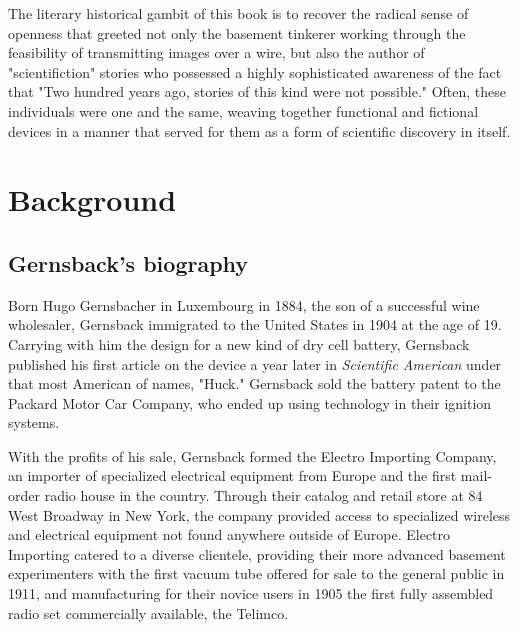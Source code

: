 \documentclass{article}
\begin{document}
The literary historical gambit of this book is to recover the radical sense of openness that greeted not only the basement tinkerer working through the feasibility of transmitting images over a wire, but also the author of "scientifiction" stories who possessed a highly sophisticated awareness of the fact that "Two hundred years ago, stories of this kind were not possible."  Often, these individuals were one and the same, weaving together functional and fictional devices in a manner that served for them as a form of scientific discovery in itself.


\section{Background}

\subsection{Gernsback's biography}

Born Hugo Gernsbacher in Luxembourg in 1884, the son of a successful wine wholesaler, Gernsback immigrated to the United States in 1904 at the age of 19.  Carrying with him the design for a new kind of dry cell battery, Gernsback published his first article on the device a year later in \textit{Scientific American} under that most American of names, "Huck."  Gernsback sold the battery patent to the Packard Motor Car Company, who ended up using technology in their ignition systems.  

With the profits of his sale, Gernsback formed the Electro Importing Company, an importer of specialized electrical equipment from Europe and the first mail-order radio house in the country.  Through their catalog and retail store at 84 West Broadway in New York, the company provided access to specialized wireless and electrical equipment not found anywhere outside of Europe.  Electro Importing catered to a diverse clientele, providing their more advanced basement experimenters with the first vacuum tube offered for sale to the general public in 1911, and manufacturing for their novice users in 1905 the first fully assembled radio set commercially available, the Telimco.
\end{document}
